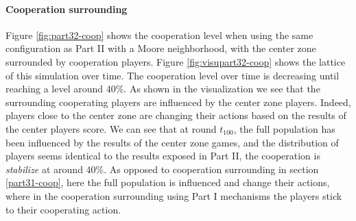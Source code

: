 \documentclass[letterpaper]{article}
\begin{document}
\paragraph{Cooperation surrounding}

Figure \ref{fig:part32-coop} shows
the cooperation level when using the same configuration as Part II
with a Moore neighborhood, with the center zone surrounded
by cooperation players. Figure \ref{fig:visupart32-coop} shows the
lattice of this simulation over time. The cooperation level over time
is decreasing until reaching a level around 40\%. As shown in the visualization
we see that the surrounding cooperating players are influenced by the center
zone players. Indeed, players close to the center zone are changing their
actions based on the results of the center players score. We can see
that at round $t_{100}$, the full population has been influenced
by the results of the center zone games, and the distribution of
players seems identical
to the results exposed in Part II, the cooperation is \textit{stabilize}
at around 40\%. As opposed to cooperation surrounding
in section \ref{part31-coop}, here the full population is influenced and
change their actions, where in the cooperation surrounding using Part I
mechanisms the players stick to their cooperating action.
\end{document}
